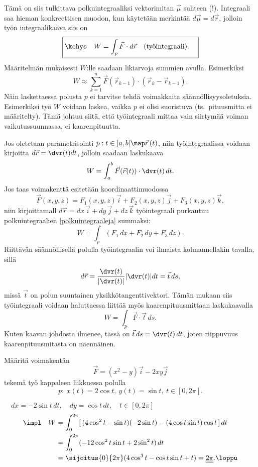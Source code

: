 Tämä on siis tulkittava polkuintegraaliksi vektorimitan $\vec\mu$ suhteen (!). Integraali saa
hieman konkreettisen muodon, kun käytetään merkintää $d\vec\mu=d\vec r$, jolloin työn
integraalikaava siis on
\[
\boxed{\kehys\quad W=\int_p \vec F\cdot d\vec r \quad (\text{työintegraali}). \quad}
\]
Määritelmän mukaisesti $W$:lle saadaan likiarvoja summien avulla. Esimerkiksi
\[
W\approx\sum_{k=1}^n \vec F(\vec r_{k-1})\cdot (\vec r_k-\vec r_{k-1}).
\]
Näin laskettaessa polusta $p$ ei tarvitse tehdä voimakkaita säännöllisyysoletuksia. Esimerkiksi
työ $W$ voidaan laskea, vaikka $p$ ei olisi suoristuva (ts.\ pituusmitta ei määritelty). Tämä
johtuu siitä, että työintegraali mittaa vain siirtymää voiman vaikutussuunnassa, ei
kaarenpituutta.

Jos oletetaan parametrisointi $p: t\in[a,b] \map \vec r\,(t)$, niin työintegraalissa voidaan
kirjoitta $d\vec r=\dvr(t)dt$, jolloin saadaan laskukaava
\[
W=\int_a^b \vec F(\vec r(t))\cdot \dvr(t)\,dt.
\]
Jos taas voimakenttä esitetään koordinaattimuodossa
\[
\vec F(x,y,z)=F_1(x,y,z)\vec i + F_2(x,y,z)\vec j+F_3(x,y,z)\vec k,
\]
niin kirjoittamall $d\vec r=dx\,\vec i+dy\,\vec j+dz\,\vec k$ työintegraali purkautuu
polkuintegraalien \eqref{polkuintegraaleja} summaksi:
\[
W=\int_p (F_1\,dx+F_2\,dy+F_3\,dz).
\]
Riittävän säännöllisellä polulla työintegraalin voi ilmaista kolmannellakin tavalla, sillä
\[
d\vec r = \frac{\dvr(t)}{|\dvr(t)|}|\dvr(t)|dt = \vec t\,ds,
\]
missä $\vec t$ on polun suuntainen yksikkötangenttivektori. Tämän mukaan siis työintegraali
voidaan haluttaessa liittää myös kaarenpituusmittaan laskukaavalla
\[
W = \int_p \vec F\cdot\vec t\,ds.
\]
Kuten kaavan johdosta ilmenee, tässä on $\vec t\,ds=\dvr(t)\,dt$, joten riippuvuus
kaarenpituusmitasta on näennäinen.
\begin{Exa}
Määritä voimakentän
\[
\vec F=(x^2-y)\vec i-2xy\vec j
\]
tekemä työ kappaleen liikkuessa polulla
\[
p: \ x(t)=2\cos t, \ y(t)=\sin t, \ t\in [0,2\pi].
\]
\end{Exa}
\ratk $\quad dx=-2\sin t\,dt,\quad dy=\cos t\,dt, \quad t\in [0,2\pi]$
\begin{align*}
\impl \quad W &= \int_0^{2\pi} [\,(4\cos^2 t-\sin t)(-2\sin t)-(4\cos t\sin t)\cos t\,]\,dt \\
              &= \int_0^{2\pi} (-12\cos^2 t\sin t+2\sin^2 t)\,dt \\
              &= \sijoitus{0}{2\pi} (4\cos^3 t-\cos t\sin t+t) 
               = \underline{\underline{2\pi}}. \loppu
\end{align*}

